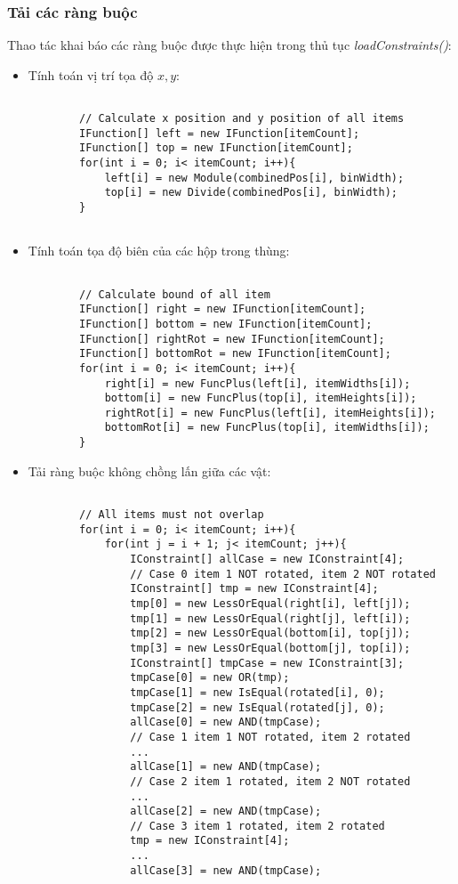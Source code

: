 \subsubsection{Tải các ràng buộc}
	Thao tác khai báo các ràng buộc được thực hiện trong thủ tục \textit{loadConstraints()}:
	\begin{itemize}
		\item Tính toán vị trí tọa độ $x, y$:
		\begin{lstlisting}
		
		// Calculate x position and y position of all items
		IFunction[] left = new IFunction[itemCount];
		IFunction[] top = new IFunction[itemCount];
		for(int i = 0; i< itemCount; i++){
			left[i] = new Module(combinedPos[i], binWidth);
			top[i] = new Divide(combinedPos[i], binWidth);
		}
		
		\end{lstlisting}
		\item Tính toán tọa độ biên của các hộp trong thùng:
		
		\begin{lstlisting}
		
		// Calculate bound of all item
		IFunction[] right = new IFunction[itemCount];
		IFunction[] bottom = new IFunction[itemCount];
		IFunction[] rightRot = new IFunction[itemCount];
		IFunction[] bottomRot = new IFunction[itemCount];
		for(int i = 0; i< itemCount; i++){
			right[i] = new FuncPlus(left[i], itemWidths[i]);
			bottom[i] = new FuncPlus(top[i], itemHeights[i]);
			rightRot[i] = new FuncPlus(left[i], itemHeights[i]);
			bottomRot[i] = new FuncPlus(top[i], itemWidths[i]);
		}
		\end{lstlisting}
		\item Tải ràng buộc không chồng lấn giữa các vật:
		\begin{lstlisting}
		
		// All items must not overlap
		for(int i = 0; i< itemCount; i++){
			for(int j = i + 1; j< itemCount; j++){
				IConstraint[] allCase = new IConstraint[4];
				// Case 0 item 1 NOT rotated, item 2 NOT rotated
				IConstraint[] tmp = new IConstraint[4];
				tmp[0] = new LessOrEqual(right[i], left[j]);
				tmp[1] = new LessOrEqual(right[j], left[i]);
				tmp[2] = new LessOrEqual(bottom[i], top[j]);
				tmp[3] = new LessOrEqual(bottom[j], top[i]);
				IConstraint[] tmpCase = new IConstraint[3];
				tmpCase[0] = new OR(tmp);
				tmpCase[1] = new IsEqual(rotated[i], 0);
				tmpCase[2] = new IsEqual(rotated[j], 0);
				allCase[0] = new AND(tmpCase);
				// Case 1 item 1 NOT rotated, item 2 rotated
				...
				allCase[1] = new AND(tmpCase);
				// Case 2 item 1 rotated, item 2 NOT rotated
				...
				allCase[2] = new AND(tmpCase);
				// Case 3 item 1 rotated, item 2 rotated
				tmp = new IConstraint[4];
				...
				allCase[3] = new AND(tmpCase);
				

\end{lstlisting}
\end{itemize}
